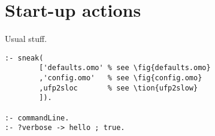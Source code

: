\section{ Start-up actions
}
Usual stuff.
\begin{Verbatim}
:- sneak(
        ['defaults.omo' % see \fig{defaults.omo}
        ,'config.omo'   % see \fig{config.omo}
        ,ufp2sloc       % see \tion{ufp2slow}
        ]).

:- commandLine.
:- ?verbose -> hello ; true.
\end{Verbatim}
